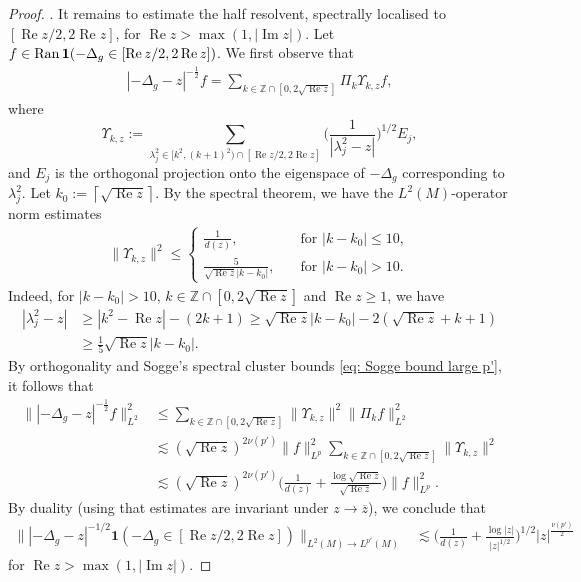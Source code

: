 \documentclass[12pt,reqno]{amsart}
\theoremstyle{definition}
\theoremstyle{remark}
\numberwithin{equation}{section}
\newcommand{\1}{\mathbbm{1}}
\newcommand{\Z}{\mathbb{Z}}
\newcommand{\ceil}[1]{\left \lceil{#1}\right \rceil }
\DeclareMathOperator{\im}{Im}
\DeclareMathOperator{\re}{Re}
\newcommand{\Ran}{\mathop{\rm Ran}}
\begin{document}
\begin{proof}
  . It remains to estimate the half resolvent, spectrally localised to $[\re z/2,2\re z]$, for $\re z>\max(1,|\im z|)$. Let $f\in \Ran\mathbf{1}(-\Delta_g\in[\re z/2,2\re z])$. We first observe that
  \begin{align*}
    |-\Delta_g-z|^{-\frac12}f=\sum_{k\in \Z\cap [0,2\sqrt{\re z}]}\Pi_k\Upsilon_{k,z}f,
  \end{align*}
  where 
  $$
  \Upsilon_{k,z}:=\sum_{\lambda_j^2\in [k^2,(k+1)^2)\cap [\re z/2,2\re z] }\Big(\frac{1}{|\lambda_j^2-z|}\Big)^{1/2}E_j,
  $$
  and $E_j$ is the orthogonal projection onto the eigenspace of $-\Delta_g$ corresponding to $\lambda_j^2$.
  Let $k_0:=\ceil{\sqrt{\re z}}$.
  By the spectral theorem, we have the $L^2(M)$-operator norm estimates
  \begin{align}
    \|\Upsilon_{k,z}\|^2\leq 
    \begin{cases}
    \frac{1}{d(z)},\quad &\mbox{for }|k-k_0|\leq 10,\\
    \frac{5}{\sqrt{\re z}|k-k_0|},\quad &\mbox{for }|k-k_0|> 10.
    \end{cases}
  \end{align}
Indeed, for $|k-k_0|> 10$, $k\in \Z\cap [0,2\sqrt{\re z}]$ and $\re z\geq 1$, we have 
\begin{align*}
    |\lambda_j^2-z|
    & \geq |k^2-\re z|-(2k+1)
    \geq \sqrt{\re z}|k-k_0|-2(\sqrt{\re z}+k+1) \\
    & \geq \frac{1}{5}\sqrt{\re z}|k-k_0|.
\end{align*}
  By orthogonality and Sogge's spectral cluster bounds \eqref{eq: Sogge bound large p'}, it follows that 
  \begin{align*}
    \||-\Delta_g-z|^{-\frac12}f\|_{L^2}^2
    &\leq \sum_{k\in \Z\cap [0,2\sqrt{\re z}]} \|\Upsilon_{k,z}\|^2\|\Pi_kf\|_{L^2}^2\\
    &\lesssim (\sqrt{\re z})^{2\nu(p')}\|f\|_{L^p}^2\sum_{k\in \Z\cap [0,2\sqrt{\re z}]} \|\Upsilon_{k,z}\|^2\\
    &\lesssim (\sqrt{\re z})^{2\nu(p')}\Big(\frac{1}{d(z)}+\frac{\log\sqrt{\re z}}{\sqrt{\re z}}\Big)\|f\|_{L^p}^2.
  \end{align*}
 By duality (using that estimates are invariant under $z\to \overline{z}$), we conclude that
  \begin{align*}
    \||-\Delta_g-z|^{-1/2}\mathbf{1}(-\Delta_g\in[\re z/2,2\re z])\|_{L^{2}(M)\to L^{p'}(M)}
    & \lesssim \Big(\frac{1}{d(z)}+\frac{\log |z|}{|z|^{1/2}}\Big)^{1/2} |z|^{\frac{\nu(p')}{2}}
  \end{align*}
  for $\re z>\max(1,|\im z|)$.
\end{proof}
\end{document}
